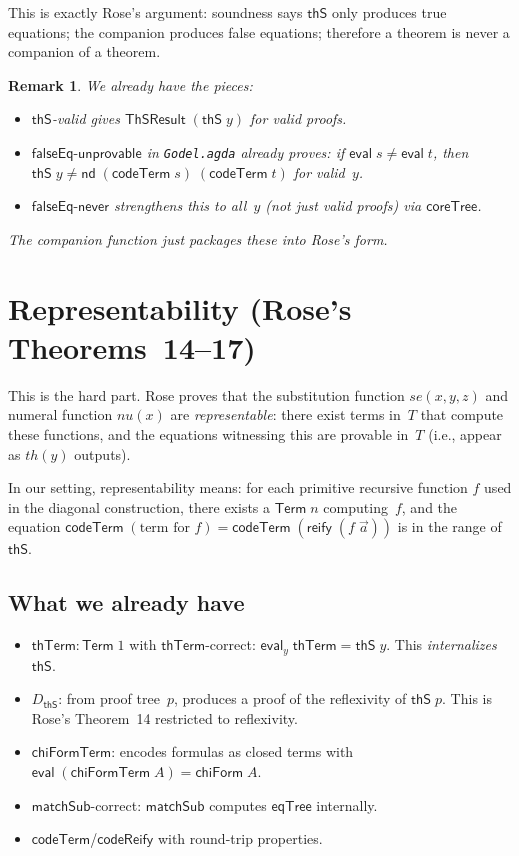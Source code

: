 \documentclass[11pt]{article}
\newtheorem{remark}[theorem]{Remark}
\newcommand{\nd}{\mathsf{nd}}
\newcommand{\eval}{\mathsf{eval}}
\newcommand{\reify}{\mathsf{reify}}
\newcommand{\codeTerm}{\mathsf{codeTerm}}
\newcommand{\codeReify}{\mathsf{codeReify}}
\newcommand{\thS}{\mathsf{thS}}
\newcommand{\thTerm}{\mathsf{thTerm}}
\newcommand{\eqTree}{\mathsf{eqTree}}
\newcommand{\Term}{\mathsf{Term}}
\newcommand{\dThS}{D_{\thS}}
\newcommand{\ThSResult}{\mathsf{ThSResult}}
\newcommand{\coreTree}{\mathsf{coreTree}}
\newcommand{\matchSub}{\mathsf{matchSub}}
\begin{document}
\noindent
This is exactly Rose's argument: soundness says $\thS$ only produces
true equations; the companion produces false equations; therefore a
theorem is never a companion of a theorem.

\begin{remark}
We already have the pieces:
\begin{itemize}
  \item $\thS$-valid gives $\ThSResult\;(\thS\;y)$ for valid proofs.
  \item $\mathsf{falseEq\text{-}unprovable}$ in \texttt{Godel.agda}
    already proves: if $\eval\;s \neq \eval\;t$, then
    $\thS\;y \neq \nd\;(\codeTerm\;s)\;(\codeTerm\;t)$ for valid~$y$.
  \item $\mathsf{falseEq\text{-}never}$ strengthens this to all~$y$
    (not just valid proofs) via $\coreTree$.
\end{itemize}
The companion function just packages these into Rose's form.
\end{remark}


\section{Representability (Rose's Theorems~14--17)}\label{sec:represent}

This is the hard part.  Rose proves that the substitution function
$se(x, y, z)$ and numeral function $nu(x)$ are \emph{representable}:
there exist terms in~$T$ that compute these functions, and the
equations witnessing this are provable in~$T$ (i.e., appear as
$th(y)$ outputs).

In our setting, representability means: for each primitive recursive
function $f$ used in the diagonal construction, there exists a
$\Term\;n$ computing~$f$, and the equation
$\codeTerm\;(\text{term for } f) = \codeTerm\;(\reify\;(f\;\vec{a}))$
is in the range of~$\thS$.

\subsection{What we already have}

\begin{itemize}
\item $\thTerm : \Term\;1$ with $\thTerm$-correct: $\eval_y\;\thTerm = \thS\;y$.
  This \emph{internalizes} $\thS$.
\item $\dThS$: from proof tree~$p$, produces a proof of the reflexivity
  of $\thS\;p$.  This is Rose's Theorem~14 restricted to reflexivity.
\item $\mathsf{chiFormTerm}$: encodes formulas as closed terms with
  $\eval\;(\mathsf{chiFormTerm}\;A) = \mathsf{chiForm}\;A$.
\item $\matchSub$-correct: $\matchSub$ computes $\eqTree$ internally.
\item $\codeTerm$/$\codeReify$ with round-trip properties.
\end{itemize}
\end{document}

